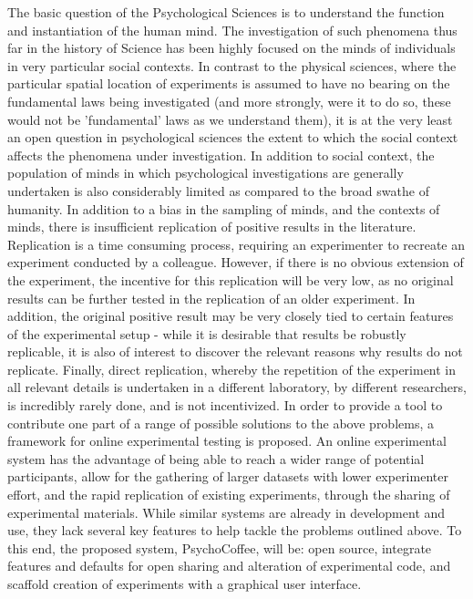 \documentclass[12pt,a4paper,titlepage]{scrreprt}
\begin{document}
    The basic question of the Psychological Sciences is to understand the function and instantiation of the human mind. The investigation of such phenomena thus far in the history of Science has been highly focused on the minds of individuals in very particular social contexts. In contrast to the physical sciences, where the particular spatial location of experiments is assumed to have no bearing on the fundamental laws being investigated (and more strongly, were it to do so, these would not be 'fundamental' laws as we understand them), it is at the very least an open question in psychological sciences the extent to which the social context affects the phenomena under investigation. In addition to social context, the population of minds in which psychological investigations are generally undertaken is also considerably limited as compared to the broad swathe of humanity.
    In addition to a bias in the sampling of minds, and the contexts of minds, there is insufficient replication of positive results in the literature. Replication is a time consuming process, requiring an experimenter to recreate an experiment conducted by a colleague. However, if there is no obvious extension of the experiment, the incentive for this replication will be very low, as no original results can be further tested in the replication of an older experiment. In addition, the original positive result may be very closely tied to certain features of the experimental setup - while it is desirable that results be robustly replicable, it is also of interest to discover the relevant reasons why results do not replicate. Finally, direct replication, whereby the repetition of the experiment in all relevant details is undertaken in a different laboratory, by different researchers, is incredibly rarely done, and is not incentivized.
    In order to provide a tool to contribute one part of a range of possible solutions to the above problems, a framework for online experimental testing is proposed. An online experimental system has the advantage of being able to reach a wider range of potential participants, allow for the gathering of larger datasets with lower experimenter effort, and the rapid replication of existing experiments, through the sharing of experimental materials. While similar systems are already in development and use, they lack several key features to help tackle the problems outlined above. To this end, the proposed system, PsychoCoffee, will be: open source, integrate features and defaults for open sharing and alteration of experimental code, and scaffold creation of experiments with a graphical user interface.
\end{document}
